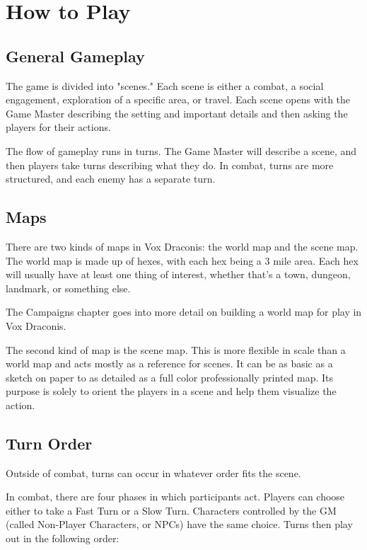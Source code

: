 \chapter{How to Play}

\begin{multicols}{2}

\section{General Gameplay}

The game is divided into "scenes." Each scene is either a combat,
a social engagement, exploration of a specific area, or
travel. Each scene opens with the Game Master describing the setting
and important details and then asking the players for their actions.

The flow of gameplay runs in turns. The Game Master will
describe a scene, and then players take turns describing
what they do. In combat, turns are more structured, and each
enemy has a separate turn.

\section{Maps}

There are two kinds of maps in Vox Draconis: the world map and the
scene map. The world map is made up of hexes, with each hex being
a 3 mile area. Each hex will usually have at least one thing of
interest, whether that's a town, dungeon, landmark, or something else.

The Campaigns chapter goes into more detail on building a world map for
play in Vox Draconis.

The second kind of map is the scene map. This is more flexible in scale than
a world map and acts mostly as a reference for scenes. It can be as basic
as a sketch on paper to as detailed as a full color professionally printed map.
Its purpose is solely to orient the players in a scene and help them visualize
the action.

\section{Turn Order}

Outside of combat, turns can occur in whatever order fits the
scene.

In combat, there are four phases in which participants
act. Players can choose either to take a Fast Turn or a Slow
Turn. Characters controlled by the GM (called Non-Player
Characters, or NPCs) have the same choice. Turns then play out
in the following order:


\end{multicols}
